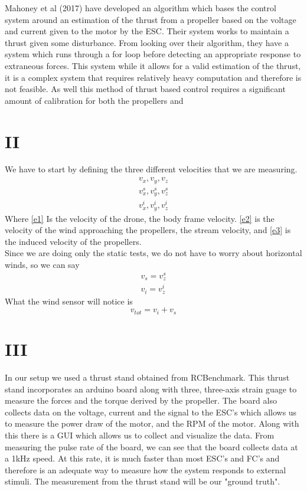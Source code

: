 \documentclass[twocolumn]{article}
\begin{document}
	Mahoney et al (2017) have developed an algorithm which bases the control system around an estimation of the thrust from a propeller based on the voltage and current given to the motor by the ESC. Their system works to maintain a thrust given some disturbance. From looking over their algorithm, they have a system which runs through a for loop before detecting an appropriate response to extraneous forces. This system while it allows for a valid estimation of the thrust, it is a complex system that requires relatively heavy computation and therefore is not feasible. As well this method of thrust based control requires a significant amount of calibration for both the propellers and 
	\section{II}
	We have to start by defining the three different velocities that we are measuring.\\
	\begin{eqnarray}
	\label{e1}
	v_x , v_y , v_z \\
	\label{e2}
	v^s_{x} , v^s_{y} , v^s_{z} \\
	\label{e3}
	v^i_{x} , v^i_{y} , v^i_{z}
	\end{eqnarray}
	Where \ref{e1} Is the velocity of the drone, the body frame velocity. \ref{e2} is the velocity of the wind approaching the propellers, the stream velocity, and \ref{e3} is the induced velocity of the propellers.\\
	Since we are doing only the static tests, we do not have to worry about horizontal winds, so we can say 
	\begin{eqnarray}
	\nonumber
	v_s = v^s_{z}\\
	\nonumber
	v_i = v^i_{z}
	\end{eqnarray}
	What the wind sensor will notice is 
	\begin{equation}
	v_{tot} = v_{i} + v_{s}
	\label{vtot}
	\end{equation}	
	\section{III} 
	In our setup we used a thrust stand obtained from RCBenchmark. This thrust stand incorporates an arduino board along with three, three-axis strain guage to measure the forces and the torque derived by the propeller. The board also collects data on the voltage, current and the signal to the ESC's which allows us to measure the power draw of the motor, and the RPM of the motor. Along with this there is a GUI which allows us to collect and visualize the data. From measuring the pulse rate of the board, we can see that the board collects data at a 1kHz speed. At this rate, it is much faster than most ESC's and FC's and therefore is an adequate way to measure how the system responds to external stimuli. The measurement from the thrust stand will be our "ground truth".
	
\end{document}
